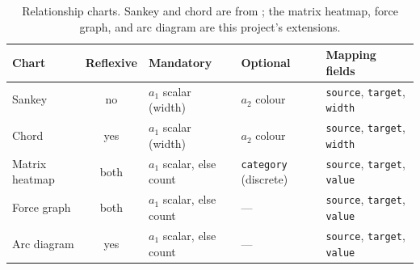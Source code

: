 \begin{table}[htbp]
\centering
\caption{Relationship charts. Sankey and chord are from \cite{brientowards}; the matrix heatmap, force graph, and arc diagram are this project's extensions.}
\label{tab:step2-relationship}
\small
\renewcommand{\arraystretch}{1.25}
\begin{tabular}{@{}lclll@{}}
\toprule
\textbf{Chart} & \textbf{Reflexive} & \textbf{Mandatory} & \textbf{Optional} & \textbf{Mapping fields} \\
\midrule
Sankey & no & $a_1$ scalar (width) & $a_2$ colour & \texttt{source}, \texttt{target}, \texttt{width} \\
Chord & yes & $a_1$ scalar (width) & $a_2$ colour & \texttt{source}, \texttt{target}, \texttt{width} \\
\addlinespace[2pt]
Matrix heatmap & both & $a_1$ scalar, else count & \texttt{category} (discrete) & \texttt{source}, \texttt{target}, \texttt{value} \\
Force graph & both & $a_1$ scalar, else count & --- & \texttt{source}, \texttt{target}, \texttt{value} \\
Arc diagram & yes & $a_1$ scalar, else count & --- & \texttt{source}, \texttt{target}, \texttt{value} \\
\bottomrule
\end{tabular}
\end{table}



